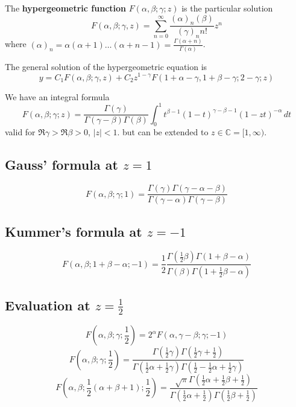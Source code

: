 \documentclass[10pt, oneside, reqno]{amsart}
\theoremstyle{plain}%
\theoremstyle{definition}
\theoremstyle{remark}
\newcommand{\C}{\mathbb{C}}
\begin{document}
The \textbf{hypergeometric function} $F(\alpha, \beta; \gamma; z)$ is the particular solution \[
	F(\alpha, \beta; \gamma, z) = \sum_{n = 0}^\infty \frac{(\alpha)_n (\beta)}{(\gamma)_n n!} z^n 
\] where $(\alpha)_n = \alpha (\alpha + 1)\dots(\alpha + n - 1) = \frac{\Gamma(\alpha + n)}{\Gamma(\alpha)}$.  

The general solution of the hypergeometric equation is \[
	y  = C_1 F(\alpha, \beta; \gamma, z) + C_2 z^{1 - \gamma} F(1 + \alpha - \gamma, 1 + \beta - \gamma; 2 -\gamma; z)
\]

We have an integral formula \[
	F(\alpha, \beta; \gamma; z) = \frac{\Gamma(\gamma)}{\Gamma(\gamma - \beta)\Gamma(\beta)} \int_0^1 t^{\beta - 1} (1-t)^{\gamma - \beta - 1} (1- zt)^{- \alpha} \,dt
\] valid for $\Re \gamma > \Re \beta > 0$, $|z| < 1$. but can be extended to $z \in \C = [1,\infty)$.

\subsection{Gauss' formula at $z = 1$} %
\label{sub:gauss_formula_at_z_1_}
	\[
		F(\alpha, \beta; \gamma; 1) = \frac{\Gamma(\gamma)\Gamma(\gamma - \alpha - \beta)}{\Gamma(\gamma - \alpha)\Gamma(\gamma - \beta)}
	\] 
\subsection{Kummer's formula at $z = -1$} %
\label{sub:kummer_s_formula_at_z_1_}
\[
	F(\alpha, \beta; 1 + \beta - \alpha; -1) = \frac{1}{2} \frac{\Gamma(\frac{1}{2}\beta)\Gamma(1 + \beta - \alpha)}{\Gamma(\beta) \Gamma(1 + \frac{1}{2}\beta - \alpha)}
\]

\subsection{Evaluation at $z = \frac{1}{2}$} %
\label{sub:evaluation_at_z_1_2_}
	\[
		F(\alpha, \beta; \gamma; \frac{1}{2}) = 2^\alpha F(\alpha, \gamma - \beta; \gamma; -1)
	\]
	\[
		F(\alpha, \beta; \gamma; \frac{1}{2}) = \frac{\Gamma(\frac{1}{2}\gamma) \Gamma(\frac{1}{2}\gamma + \frac{1}{2})}{\Gamma(\frac{1}{2}\alpha + \frac{1}{2}\gamma)\Gamma(\frac{1}{2} - \frac{1}{2}\alpha + \frac{1}{2}\gamma)}
	\]
	\[
		F(\alpha, \beta; \frac{1}{2}(\alpha + \beta +1); \frac{1}{2}) = \frac{ \sqrt{\pi} \Gamma(\frac{1}{2}\alpha + \frac{1}{2}\beta + \frac{1}{2})}{\Gamma(\frac{1}{2}\alpha + \frac{1}{2})\Gamma(\frac{1}{2}\beta + \frac{1}{2})}
	\]

\end{document}
